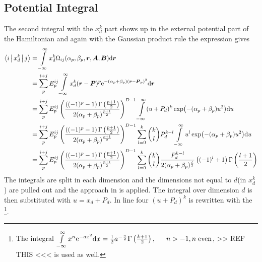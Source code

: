 \subsection{Potential Integral}
    The second integral with the $x^k_d$ part shows up in the external
    potential part of the Hamiltonian and again with the Gaussian product rule
    the expression gives
        \begin{align}
            \Braket{i|x^k_d|j} &= \int\limits^{\infty}_{-\infty} x^{k}_d
            \Omega_{ij}(\alpha_p,\beta_p,\boldsymbol{{r}},\boldsymbol{{A}},\boldsymbol{{B}}) \mathrm{d}
            \boldsymbol{{r}} \nonumber \\
            &= \sum\limits^{i+j}_{p} E^{ij}_{p} \int\limits^{\infty}_{-\infty} x^k_d (\boldsymbol{{r}}-\boldsymbol{{P}})^p
            \mathrm{e}^{-(\alpha_p+\beta_p)(\boldsymbol{{r}} - \boldsymbol{{P}}_p)^2} \mathrm{d} \boldsymbol{{r}}
            \nonumber \\
            &= \sum\limits^{i+j}_{p} E^{ij}_{p}
            \left(\frac{\left((-1)^p-1\right)\Gamma\left(\frac{p+1}{2}\right)}
            {2(\alpha_p+\beta_p)^{\frac{p+1}{2}}}\right)^{D-1} \int\limits^{\infty}_{-\infty}
            (u+P_d)^k\exp(-(\alpha_p+\beta_p)u^2) \mathrm{d} u \nonumber \\
            &= \sum\limits^{i+j}_{p} E^{ij}_{p}
            \left(\frac{\left((-1)^p-1\right)\Gamma\left(\frac{p+1}{2}\right)}
            {2(\alpha_p+\beta_p)^{\frac{p+1}{2}}}\right)^{D-1}
            \sum\limits_{l=0}^k {k\choose l} P^{k-l}_d \int\limits^{\infty}_{-\infty}
            u^l\exp(-(\alpha_p+\beta_p)u^2) \mathrm{d} u \nonumber \\
            &= \sum\limits^{i+j}_{p} E^{ij}_{p}
            \left(\frac{\left((-1)^p-1\right)\Gamma\left(\frac{p+1}{2}\right)}
            {2(\alpha_p+\beta_p)^{\frac{p+1}{2}}}\right)^{D-1}
            \sum\limits_{l=0}^k {k\choose l}
            \frac{P^{k-l}_d}{2(\alpha_p+\beta_p)^{\frac{l}{2}}}
            \left((-1)^l+1\right) \Gamma\left(\frac{l+1}{2}\right)
        \end{align}
    The integrals are split in each dimension and the dimensions not equal to
    $d$(in $x^k_d$) are pulled out and the approach in  is
    applied. The integral over dimension $d$ is then substituted with
    $u=x_d+P_d$. In line four $(u+P_d)^k$ is rewritten with the \footnote{The integral $\infint x^n\me^{-ax^2}\md x =
    \frac{1}{2}a^{-\frac{n}{2}}\Gamma\left(\frac{k+1}{2}\right),\indent n>-1,
    n\;\text{even}$, >> REF THIS <<< is used as well.}.


